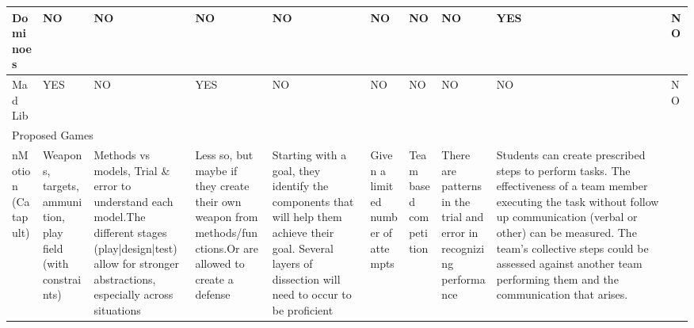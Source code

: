 \documentclass{acm_proc_article-sp}
\begin{document}
\begin{sidewaystable}[htbp]
\begin{tabular}{|p{2cm}||p{1.5cm}|p{2.5cm}|p{2.5cm}|p{2.7cm}|p{2cm}|p{1.5cm}|p{2cm}|p{4.2cm}|p{1.5cm}|}
    Dominoes 
      & NO 
      & NO 
      & NO 
      & NO 
      & NO 
      & NO 
      & NO 
      & \cellcolor{blue!25}YES 
      & NO \\ \hline

    Mad Lib 
      & \cellcolor{blue!25}YES 
      & NO 
      & \cellcolor{blue!25}YES 
      & NO 
      & NO 
      & NO 
      & NO 
      & NO 
      & NO \\ \hline \hline    

    \multicolumn{10}{|l|}{Proposed Games} \\ \hline \hline

    nMotion (Catapult)
      & \cellcolor{blue!25}\raggedright{Weapons, targets, ammunition, play field (with constraints)} 
      & \cellcolor{blue!25}\raggedright{Methods vs models, Trial \& error to understand each model.\newline \newline The different stages (play|design|test) allow for stronger abstractions, especially across situations} 
      & \cellcolor{blue!25}\raggedright{Less so, but maybe if they create their own weapon from methods/functions.\newline \newline Or are allowed to create a defense} 
      & \cellcolor{blue!25}\raggedright{Starting with a goal, they identify the components that will help them achieve their goal.
        Several layers of dissection will need to occur to be proficient} 
      & \cellcolor{blue!25}\raggedright{Given a limited number of attempts}     
      & \cellcolor{blue!25}\raggedright{Team based competition} 
      & \cellcolor{blue!25}\raggedright{There are patterns in the trial and error in recognizing performance} 
      & \cellcolor{blue!25}\raggedright{Students can create prescribed steps to perform tasks.\newline
        The effectiveness of a team member executing the task without follow up communication (verbal or other) can be measured.
        The team's collective steps could be assessed against another team performing them and the communication that arises.} 
      & \cellcolor{blue!25}{\raggedright The play phase of this game is simulation} \\ \hline
    

\end{tabular}
\end{sidewaystable}
\end{document}
